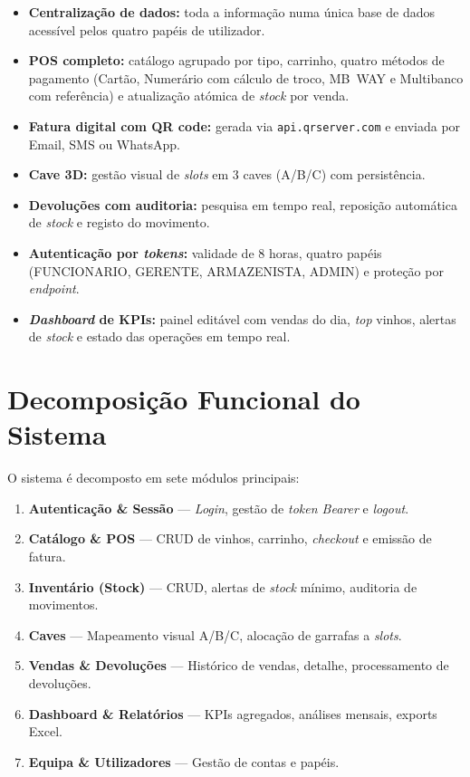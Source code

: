 \documentclass[11pt,a4paper]{report}
\begin{document}
\begin{itemize}
  \item \textbf{Centralização de dados:} toda a informação numa única base de dados acessível pelos quatro papéis de utilizador.
  \item \textbf{POS completo:} catálogo agrupado por tipo, carrinho, quatro métodos de pagamento (Cartão, Numerário com cálculo de troco, MB~WAY e Multibanco com referência) e atualização atómica de \textit{stock} por venda.
  \item \textbf{Fatura digital com QR code:} gerada via \texttt{api.qrserver.com} e enviada por Email, SMS ou WhatsApp.
  \item \textbf{Cave 3D:} gestão visual de \textit{slots} em 3 caves (A/B/C) com persistência.
  \item \textbf{Devoluções com auditoria:} pesquisa em tempo real, reposição automática de \textit{stock} e registo do movimento.
  \item \textbf{Autenticação por \textit{tokens}:} validade de 8 horas, quatro papéis (FUNCIONARIO, GERENTE, ARMAZENISTA, ADMIN) e proteção por \textit{endpoint}.
  \item \textbf{\textit{Dashboard} de KPIs:} painel editável com vendas do dia, \textit{top} vinhos, alertas de \textit{stock} e estado das operações em tempo real.
\end{itemize}

\section{Decomposição Funcional do Sistema}
O sistema é decomposto em sete módulos principais:

\begin{enumerate}
  \item \textbf{Autenticação \& Sessão} --- \textit{Login}, gestão de \textit{token Bearer} e \textit{logout}.
  \item \textbf{Catálogo \& POS} --- CRUD de vinhos, carrinho, \textit{checkout} e emissão de fatura.
  \item \textbf{Inventário (Stock)} --- CRUD, alertas de \textit{stock} mínimo, auditoria de movimentos.
  \item \textbf{Caves} --- Mapeamento visual A/B/C, alocação de garrafas a \textit{slots}.
  \item \textbf{Vendas \& Devoluções} --- Histórico de vendas, detalhe, processamento de devoluções.
  \item \textbf{Dashboard \& Relatórios} --- KPIs agregados, análises mensais, exports Excel.
  \item \textbf{Equipa \& Utilizadores} --- Gestão de contas e papéis.
\end{enumerate}
\end{document}
